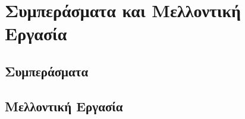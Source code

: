 
\chapter{Συμπεράσματα και Μελλοντική Εργασία} %

\label{Chapter6} %

\section{Συμπεράσματα}


\section{Μελλοντική Εργασία}
